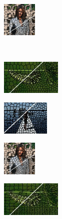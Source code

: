 \begin{figure}
\begin{subfigure}[b]{0.10\textwidth}
		\includegraphics[height=1.65cm]{pictures/fash/vc/cropped/vc_010_contours}
	\end{subfigure}\\
	\begin{subfigure}[b]{0.02\textwidth}
	\end{subfigure}
	\begin{subfigure}[b]{0.16\textwidth}
		\includegraphics[height=1.65cm]{pictures/bsds500/ccs/cropped/ccs_35028_contours}
	\end{subfigure}
	\begin{subfigure}[b]{0.129\textwidth}
		\includegraphics[height=1.65cm]{pictures/sbd/ccs/cropped/ccs_0004774_contours}
	\end{subfigure}
	\begin{subfigure}[b]{0.10\textwidth}
		\includegraphics[height=1.65cm]{pictures/fash/ccs/cropped/ccs_010_contours}
	\end{subfigure}
	\begin{subfigure}[b]{0.02\textwidth}
	\end{subfigure}
	\begin{subfigure}[b]{0.16\textwidth}
		\includegraphics[height=1.65cm]{pictures/bsds500/cw/cropped/cw_35028_contours}
	\end{subfigure}

\end{figure}
